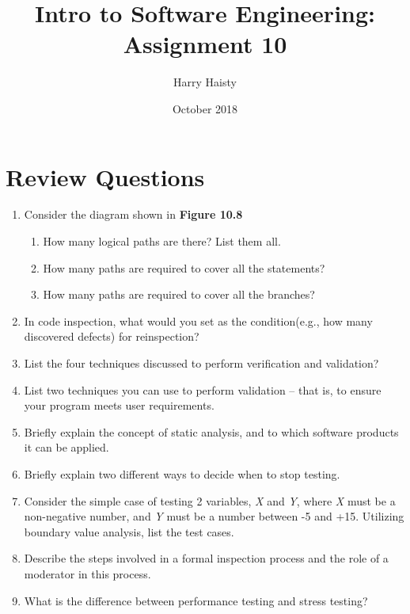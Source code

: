 \documentclass[11pt]{article}
\title{Intro to Software Engineering: Assignment 10}
\author{Harry Haisty}
\date{October 2018}
\begin{document}
\maketitle

\section*{Review Questions}
\begin{enumerate} 
\item Consider the diagram shown in \textbf{Figure 10.8}
\begin{enumerate}
\item How many logical paths are there? List them all. 
\item How many paths are required to cover all the statements?
\item How many paths are required to cover all the branches?
\end{enumerate}

\item In code inspection, what would you set as the condition(e.g., how many discovered defects) for reinspection?

\item List the four techniques discussed to perform verification and validation?

\item List two techniques you can use to perform validation -- that is, to ensure your program meets user requirements.

\item Briefly explain the concept of static analysis, and to which software products it can be applied.

\item Briefly explain two different ways to decide when to stop testing.

\item Consider the simple case of testing 2 variables, \textit{X} and \textit{Y}, where \textit{X} must be a non-negative number, and \textit{Y} must be a number between -5 and +15. Utilizing boundary value analysis, list the test cases.

\item Describe the steps involved in a formal inspection process and the role of a moderator in this process.

\item What is the difference between performance testing and stress testing?

\end{enumerate}
\end{document}
